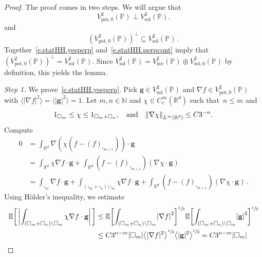 \documentclass[11pt]{article} %
\let\oldsquare\square %
\renewcommand{\square}{\oldsquare}
\numberwithin{equation}{section}
\theoremstyle{definition}
\let\originalleft\left
\let\originalright\right
\renewcommand{\left}{\mathopen{}\mathclose\bgroup\originalleft}
\renewcommand{\right}{\aftergroup\egroup\originalright}
\newcommand*{\N}{\ensuremath{\mathbb{N}}}
\newcommand*{\Rd}{\ensuremath{\mathbb{R}^d}}
\renewcommand*{\tilde}{\widetilde}
\newcommand{\qand}{\quad \mbox{and} \quad }
\newcommand{\g}{\mathbf{g}}
\newcommand{\pot}{\mathrm{pot}}
\newcommand{\sol}{\mathrm{sol}}
\newcommand{\inv}{\mathrm{inv}}
\newcommand{\cu}{\square}
\renewcommand{\P}{\mathbb{P}}
\newcommand{\E}{\mathbb{E}}
\newcommand{\indc}{1}
\def\Xint#1{\mathchoice
{\XXint\displaystyle\textstyle{#1}}%
{\XXint\textstyle\scriptstyle{#1}}%
{\XXint\scriptstyle\scriptscriptstyle{#1}}%
{\XXint\scriptscriptstyle\scriptscriptstyle{#1}}%
\!\int}
\def\XXint#1#2#3{{\setbox0=\hbox{$#1{#2#3}{\int}$}
\vcenter{\hbox{$#2#3$}}\kern-.5\wd0}}
\def\fint{\Xint-}
\begin{document}
\begin{proof}
The proof comes in two steps. 
We will argue that 
\begin{equation}
\label{e.statHH.yesperp}
V^2_{\pot,0}(\P) \perp V^2_\sol(\P).
\end{equation}
and
\begin{equation}
\label{e.statHH.perpcont}
(V^2_{\pot,0}(\P))^\perp \subseteq V^2_\sol(\P)
\,.
\end{equation}
Together~\eqref{e.statHH.yesperp} and~\eqref{e.statHH.perpcont} imply that $(V^2_{\pot,0}(\P))^\perp = V^2_\sol(\P)$. Since $V^2_\sol(\P) = V^2_{\inv}(\P) \oplus V^2_{\sol,0}(\P)$ by definition, this yields the lemma. 

\smallskip

\emph{Step 1.} We prove~\eqref{e.statHH.yesperp}. 
Pick $\g\in V^2_{\sol}(\P)$ and $\nabla f\in V^2_{\pot,0}(\P)$ with $\langle |\nabla f|^2\rangle=\langle |\g|^2\rangle =1$. Let $m,n\in\N$ and $\chi \in C^\infty_c(\Rd)$ such that~$n\leq m$ and  
\begin{align*}
\indc_{\cu_m} \leq \chi \leq \indc_{\cu_m+\cu_n}, 
\qand
\left\| \nabla \chi \right\|_{L^\infty(\Rd)} 
\leq 
C3^{-n}.
\end{align*}
Compute 
\begin{align*}
0
&
=
\int_{\Rd} \nabla (\chi (f- (f)_{\cu_{m+1}} ) ) \cdot \g
\\ & 
=
\int_{\Rd} \chi \nabla f \cdot \g 
+
\int_{\Rd} 
(f- (f)_{\cu_{m+1}} ) (\nabla \chi \cdot \g )
\\ &
=
\int_{\cu_m} \nabla f \cdot \g 
+
\int_{(\cu_m+\cu_n)\setminus\cu_m}
\chi\nabla f \cdot \g
+
\int_{\Rd} 
 (f- (f)_{\cu_{m+1}} ) (\nabla \chi \cdot \g )
 \,.
\end{align*}
Using H\"older's inequality, we estimate
\begin{align*}
\E\biggl[ \,
\biggl| \int_{(\cu_m+\cu_n)\setminus\cu_m}
\chi\nabla f \cdot \g \biggr| \,
\biggr]
&
\leq 
\E\biggl[ 
\int_{(\cu_m+\cu_n)\setminus\cu_m}
\left| \nabla f \right|^2  \biggr]^{\sfrac12} 
\E \biggl[ 
\int_{(\cu_m+\cu_n)\setminus\cu_m}
\left| \g \right|^2 \biggr]^{\sfrac12}
\\ & 
\leq 
C 3^{n-m} |\cu_m|
\left\langle |\nabla f |^2\right\rangle^{\sfrac12}
\left\langle |\g |^2\right\rangle^{\sfrac12}
=
C3^{n-m} |\cu_m|
\end{align*}

\end{proof}
\end{document}
